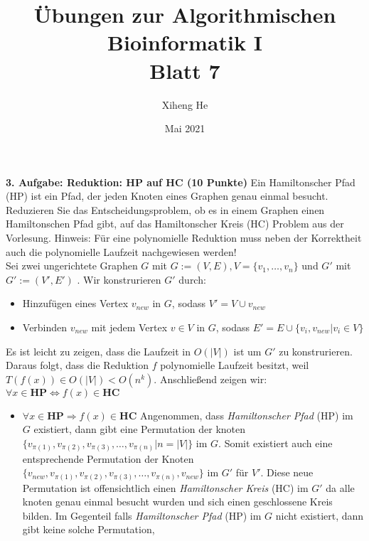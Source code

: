 \documentclass{article}
\title{Übungen zur Algorithmischen Bioinformatik I\\
Blatt 7}
\author{Xiheng He }
\date{Mai 2021}
\begin{document}
\maketitle
\begin{flushleft}
\textbf{3. Aufgabe: Reduktion: HP auf HC (10 Punkte)}
\newline
Ein Hamiltonscher Pfad (HP) ist ein Pfad, der jeden Knoten eines Graphen genau einmal besucht.
Reduzieren Sie das Entscheidungsproblem, ob es in einem Graphen einen Hamiltonschen Pfad gibt,
auf das Hamiltonscher Kreis (HC) Problem aus der Vorlesung.
\newline
Hinweis: Für eine polynomielle Reduktion muss neben der Korrektheit auch die polynomielle Laufzeit
nachgewiesen werden!
\newline \\
Sei zwei ungerichtete Graphen $G$ mit $G:= (V,E), V = \{v_1,\dots,v_n\}$ und $G'$ mit $G':= (V',E')$ .
Wir konstrurieren $G'$ durch:
\begin{itemize}
    \item Hinzufügen eines Vertex $v_{new}$ in $G$, sodass $V' = V \cup v_{new}$  
    \item Verbinden $v_{new}$ mit jedem Vertex $v \in V$ in $G$, sodass $E' = E \cup \{v_i, v_{new}|v_i \in V\}$
\end{itemize}  
Es ist leicht zu zeigen, dass die Laufzeit in $O(|V|)$ ist um $G'$ zu konstrurieren.
\newline
Daraus folgt, dass die Reduktion $f$ polynomielle Laufzeit besitzt, weil $T(f(x)) \in O(|V|) < O(n^k)$.
\newline
Anschließend zeigen wir: $\forall x \in \textbf{HP} \Leftrightarrow f(x) \in \textbf{HC}$
\begin{itemize}
    \item $\forall x \in \textbf{HP} \Longrightarrow f(x) \in \textbf{HC}$
    \newline
    Angenommen, dass \emph{Hamiltonscher Pfad} (HP) im $G$ existiert, dann gibt eine Permutation der knoten $\{v_{\pi(1)},v_{\pi(2)},
    v_{\pi(3)},\dots,v_{\pi(n)}|n = |V|\}$ im $G$.
    Somit existiert auch eine entsprechende Permutation der Knoten $\{v_{new}, v_{\pi(1)},v_{\pi(2)},
    v_{\pi(3)},\dots,v_{\pi(n)}, v_{new}\}$ im $G'$ für $V'$. Diese neue Permutation ist offensichtlich einen 
    \emph{Hamiltonscher Kreis} (HC) im $G'$ da alle knoten genau einmal besucht wurden und sich einen geschlossene Kreis 
    bilden. Im Gegenteil falls \emph{Hamiltonscher Pfad} (HP) im $G$ nicht existiert, dann gibt keine solche Permutation, 

\end{itemize}
\end{flushleft}
\end{document}
